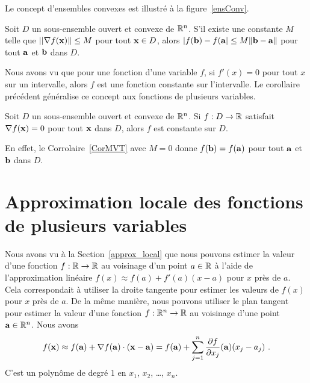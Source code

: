 {Le concept d'ensembles convexes est illustré à la figure~\ref{ensConv}.


\begin{focus}{\cor} \label{CorMVT}
Soit $D$ un sous-ensemble ouvert et convexe de $\mathbb{R}^n$.  S'il existe
une constante $M$ telle que $||\nabla f(\mathbf{x})\| \leq M$ pour tout
$\mathbf{x} \in D$, alors
$|f(\mathbf{b}) - f(\mathbf{a}| \leq M \|\mathbf{b} - \mathbf{a}\|$ pour tout
$\mathbf{a}$ et $\mathbf{b}$ dans $D$.
\end{focus}

Nous avons vu que pour une fonction d'une variable $f$, si $f'(x) = 0$ pour
tout $x$ sur un intervalle, alors $f$ est une fonction constante sur
l'intervalle.  Le corollaire précédent généralise ce concept aux
fonctions de plusieurs variables.

\begin{focus}{\cor}
Soit $D$ un sous-ensemble ouvert et convexe de $\mathbb{R}^n$.  Si $f:D \to
\mathbb{R}$ satisfait $\nabla f(\mathbf{x}) = 0$ pour tout $\mathbf{x}$ dans $D$,
alors $f$ est constante sur $D$.
\end{focus}

En effet, le Corrolaire~\ref{CorMVT} avec $M=0$ donne
$f(\mathbf{b}) = f(\mathbf{a})$ pour tout $\mathbf{a}$ et $\mathbf{b}$ dans $D$.

\section{Approximation locale des fonctions de plusieurs
  variables \eng}

Nous avons vu à la Section~\ref{approx_local} que nous pouvons estimer la
valeur d'une fonction $f:\mathbb{R} \to \mathbb{R}$ au voisinage d'un point $a \in \mathbb{R}$
à l'aide de l'approximation linéaire $f(x) \approx f(a) + f'(a) (x-a)$
pour $x$ près de $a$.  Cela correspondait à utiliser la droite
tangente pour estimer les valeurs de $f(x)$ pour $x$ près de $a$.  De
la même manière, nous pouvons utiliser le plan tangent pour estimer la
valeur d'une fonction $f:\mathbb{R}^n \to \mathbb{R}$ au voisinage d'une point
$\mathbf{a} \in \mathbb{R}^n$.  Nous avons
\begin{equation}
f(\mathbf{x}) \approx f(\mathbf{a}) + \nabla f(\mathbf{a})\cdot (\mathbf{x} - \mathbf{a})
= f(\mathbf{a}) + \sum_{j=1}^n \frac{\partial f}{\partial x_j}(\mathbf{a}) (x_j - a_j) \ .
\label{linApproDimN}
\end{equation}
C'est un polynôme de degré $1$ en $x_1$, $x_2$, \ldots, $x_n$.

}
